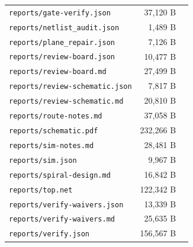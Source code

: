 \documentclass[11pt,a4paper]{article}
\begin{document}
{\begin{longtable}{p{9cm}rp{4cm}}
\texttt{reports/gate-verify.json} & 37,120 B &  \\
\texttt{reports/netlist\_audit.json} & 1,489 B &  \\
\texttt{reports/plane\_repair.json} & 7,126 B &  \\
\texttt{reports/review-board.json} & 10,477 B &  \\
\texttt{reports/review-board.md} & 27,499 B &  \\
\texttt{reports/review-schematic.json} & 7,817 B &  \\
\texttt{reports/review-schematic.md} & 20,810 B &  \\
\texttt{reports/route-notes.md} & 37,058 B &  \\
\texttt{reports/schematic.pdf} & 232,266 B &  \\
\texttt{reports/sim-notes.md} & 28,481 B &  \\
\texttt{reports/sim.json} & 9,967 B &  \\
\texttt{reports/spiral-design.md} & 16,842 B &  \\
\texttt{reports/top.net} & 122,342 B &  \\
\texttt{reports/verify-waivers.json} & 13,339 B &  \\
\texttt{reports/verify-waivers.md} & 25,635 B &  \\
\texttt{reports/verify.json} & 156,567 B &  \\
\bottomrule
\end{longtable}
}
\end{document}
